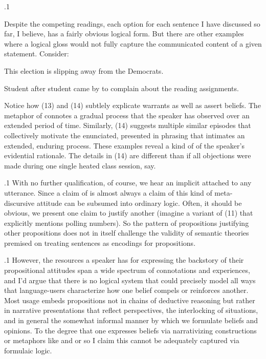 \documentclass[11pt, twocolumn]{article}
\begin{document}
\p.1{%
Despite the competing readings, each option for each sentence I have discussed so
far, I believe, has a fairly obvious logical form. But there are other examples where a logical
gloss would not fully capture the communicated content of a given statement. Consider:

\begin{exsGroup}

\exsItem{}  This election is slipping away from the Democrats.

\exsItem{}  Student after student came by to complain about the reading assignments.

\end{exsGroup}

\nip{}%
Notice how \exsRef(13) and \exsRef(14) subtlely explicate warrants as well as assert beliefs.
The metaphor of  connotes a
gradual process that the speaker has observed over an extended period of time. Similarly,
\exsRef(14) suggests multiple similar episodes that collectively motivate the enunciated,
presented in phrasing that intimates an extended,
enduring process. These examples reveal a kind of  of the speaker's evidential
rationale. The details in \exsRef(14) are different than if all objections were made during one
single heated class session, say.
}%

\p.1{%
With no further qualification, of course, we
hear an implicit  attached to any utterance. Since a
claim of  is almost always a claim of  this kind of
meta-discursive attitude can be subsumed into ordinary logic.
Often, it should be obvious, we present one claim to justify another
(imagine a variant of \exsRef(11) that explicitly mentions polling numbers).
So the pattern of propositions justifying other propositions
does not in itself challenge the validity of semantic theories
premised on treating sentences as encodings for propositions.
}%

\p.1{%
However, the resources a speaker has for expressing the backstory of their
propositional attitudes span a wide spectrum of connotations and experiences,
and I'd argue that there is no logical system that could precisely model
all ways that language-users characterize how one belief compels
or reinforces another. Most usage embeds propositions not in
chains of deductive reasoning but rather in narrative presentations
that reflect perspectives, the interlocking of situations, and
in general the somewhat informal manner by which
we formulate beliefs and opinions. To the degree that one
expresses beliefs via narrativizing constructions or metaphors like
 and  \mdash{} or so I claim \mdash{} this
 cannot be adequately captured via formulaic logic.
}%
\end{document}
